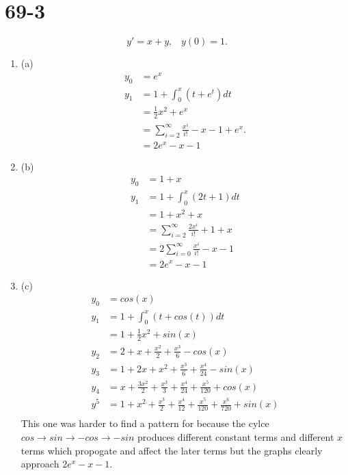 \documentclass{article}
\begin{document}
    \section{69-3}
    \[
    y' = x + y, \; \; \; y(0) = 1
    .\] 
    \begin{enumerate}
        \item (a)
        \begin{align*}
            y_0 &= e^{x}\\
            y_1 &= 1 + \int_{0}^{x}(t+e^{t})dt\\
                &=  \frac{1}{2}x^2 + e^{x}\\
                &= \sum_{i=2}^{\infty}\frac{x^{i}}{i!} - x - 1 + e^{x}.\\
                &= 2e^{x}-x-1
        \end{align*}
    \item (b)
        \begin{align*}
            y_0 &= 1 + x\\
            y_1 &= 1 + \int_{0}^{x}(2t+1)dt\\
                &= 1 + x^2 + x\\
                &= \sum_{i=2}^{\infty}\frac{2x^{i}}{i!} + 1 + x\\
                &= 2\sum_{i=0}^{\infty}\frac{x^{i}}{i!} - x - 1\\
                &= 2e^{x}-x-1
        \end{align*}
    \item (c)
        \begin{align*}
            y_0 &= cos(x)\\
            y_1 &= 1 + \int_{0}^{x}(t+cos(t))dt\\
                &= 1 + \frac{1}{2}x^2 + sin(x)\\
            y_2 &= 2 + x + \frac{x^2}{2} + \frac{x^{3}}{6}-cos(x)\\
            y_3 &= 1 + 2x + x^2+  \frac{x^{3}}{6} + \frac{x^{4}}{24} - sin(x) \\
            y_4 &= x + \frac{3x^2}{2} + \frac{x^{3}}{3} + \frac{x^{4}}{24}  + \frac{x^{5}}{120} + cos(x)\\
            y^{5} &= 1 + x^2 + \frac{x^{3}}{2} + \frac{x^{4}}{12} + \frac{x^{5}}{120} + \frac{x^{6}}{720} + sin(x)\\
        \end{align*}
        This one was harder to find a pattern for because the cylce $cos \rightarrow sin \rightarrow -cos \rightarrow -sin$ produces different constant terms and different $x$ terms
        which propogate and affect the later terms but the graphs clearly approach $2e^{x}-x-1$.

    \end{enumerate}
    
\end{document}
